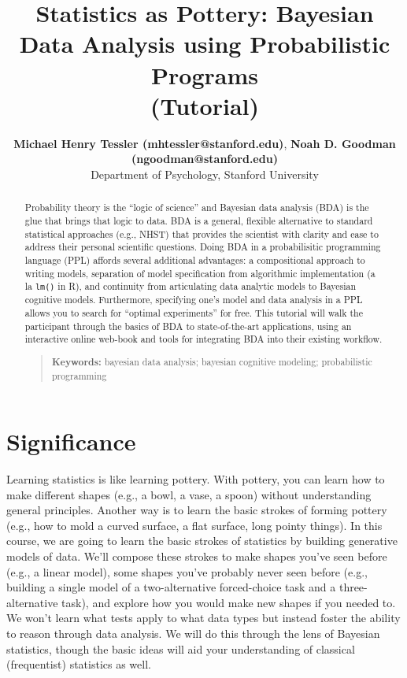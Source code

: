 \documentclass[10pt,letterpaper]{article}
\title{Statistics as Pottery: Bayesian Data Analysis using Probabilistic Programs \\(Tutorial)}
\author{{\large \bf Michael Henry Tessler (mhtessler@stanford.edu)}, {\large \bf Noah D. Goodman (ngoodman@stanford.edu)}  \\
  Department of Psychology, Stanford University
  }
\begin{document}
\maketitle

\begin{abstract}

Probability theory is the ``logic of science'' \cite{jaynes2003probability} and Bayesian data analysis (BDA) is the glue that brings that logic to data.
BDA is a general, flexible alternative to standard statistical approaches (e.g., NHST) that provides the scientist with clarity and ease to address their personal scientific questions. 
Doing BDA in a probabilisitic programming language (PPL) affords several additional advantages:  a compositional approach to writing models, separation of model specification from algorithmic implementation (a la \lstinline{lm()} in R), and continuity from articulating data analytic models to Bayesian cognitive models. 
Furthermore, specifying one's model and data analysis in a PPL allows you to search for ``optimal experiments'' for free. 
This tutorial will walk the participant through the basics of BDA to state-of-the-art applications, using an interactive online web-book and tools for integrating BDA into their existing workflow. 
\begin{quote}
\small
\textbf{Keywords:} 
bayesian data analysis; bayesian cognitive modeling; probabilistic programming
\end{quote}

\end{abstract}





\section{Significance}

Learning statistics is like learning pottery. 
With pottery, you can learn how to make different shapes (e.g., a bowl, a vase, a spoon) without understanding general principles. 
Another way is to learn the basic strokes of forming pottery (e.g., how to mold a curved surface, a flat surface, long pointy things). 
In this course, we are going to learn the basic strokes of statistics by building generative models of data. 
We'll compose these strokes to make shapes you've seen before (e.g., a linear model), some shapes you've probably never seen before (e.g., building a single model of a two-alternative forced-choice task and a three-alternative task), and explore how you would make new shapes if you needed to. 
We won't learn what tests apply to what data types but instead foster the ability to reason through data analysis. 
We will do this through the lens of Bayesian statistics, though the basic ideas will aid your understanding of classical (frequentist) statistics as well.
\end{document}
